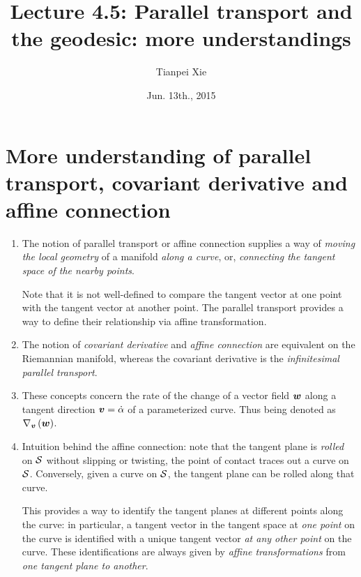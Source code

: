 \documentclass[11pt]{article}
\begin{document}
\title{Lecture 4.5: Parallel transport and the geodesic: more understandings}
\author{ Tianpei Xie}
\date{ Jun. 13th., 2015 }
\maketitle
\tableofcontents
\newpage
\section{More understanding of parallel transport, covariant derivative and affine connection}
\begin{enumerate}
\item The notion of parallel transport or affine connection supplies a way of \emph{moving the local geometry} of a manifold \emph{along a curve}, or, \emph{connecting the tangent space of the nearby points}.

 Note that it is not well-defined to compare the tangent vector at one point with the tangent vector at another point. The parallel transport provides a way to define their relationship via affine transformation.

\item The notion of \emph{covariant derivative} and \emph{affine connection} are equivalent on the Riemannian manifold, whereas the covariant derivative is the \emph{infinitesimal parallel transport}. 

\item These concepts concern the rate of the change of a vector field $\boldsymbol{w}$ along a tangent direction $\boldsymbol{v} = \dot{\alpha}$ of a parameterized curve. Thus being denoted as $\nabla_{\boldsymbol{v}}\left(\boldsymbol{w}\right)$. \\[5pt]

\item Intuition behind the affine connection:  note that the tangent plane is \emph{rolled} on ${\mathcal S}$ without slipping or twisting, the point of contact traces out a curve on ${\mathcal S}$. Conversely, given a curve on ${\mathcal S}$, the tangent plane can be rolled along that curve. 

This provides a way to identify the tangent planes at different points along the curve: in particular, a tangent vector in the tangent space at \emph{one point} on the curve is identified with a unique tangent vector \emph{at any other point} on the curve. These identifications are always given by \emph{affine transformations} from \emph{one tangent plane to another}.


\end{enumerate}
\end{document}
